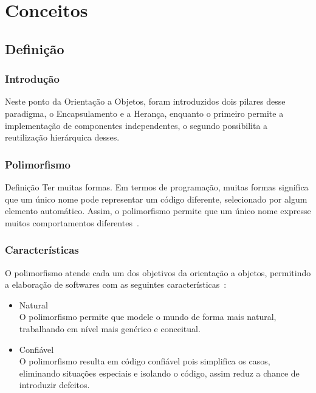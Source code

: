 \section{Conceitos}

\subsection{Definição}

\begin{frame}
\frametitle{Introdução}
\justifying
\quad Neste ponto da Orientação a Objetos, foram introduzidos dois pilares desse paradigma, o Encapsulamento e a Herança, enquanto o primeiro permite a implementação de componentes independentes, o segundo possibilita a reutilização hierárquica desses.
\end{frame}

\begin{frame}
\frametitle{Polimorfismo}
\begin{block}{Definição}
\qquad Ter muitas formas. Em termos de programação, muitas formas significa que um único nome pode representar um código diferente, selecionado por algum elemento automático. Assim, o polimorfismo permite que um único nome expresse muitos comportamentos diferentes~\cite{sintes2002aprenda}.
\end{block}
\end{frame}

\begin{frame}
\frametitle{Características}
O polimorfismo atende cada um dos objetivos da orientação a objetos, permitindo a elaboração de softwares com as seguintes características~\cite{sintes2002aprenda}:

\begin{itemize}
\item Natural\\{\footnotesize O polimorfismo permite que modele o mundo de forma mais natural, trabalhando em nível mais genérico e conceitual.}
\item Confiável\\{\footnotesize O polimorfismo resulta em código confiável pois simplifica os casos, eliminando situações especiais e isolando o código, assim reduz a chance de introduzir defeitos.}
\end{itemize}
\end{frame}

